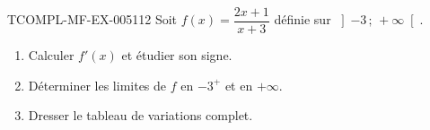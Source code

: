 \begin{exercice}{TCOMPL-MF-EX-005}{1}{12}
Soit $f(x)=\dfrac{2x+1}{x+3}$ définie sur $\left]-3\,;\,+\infty\right[$.
\begin{enumerate}
  \item Calculer $f'(x)$ et étudier son signe.
  \item Déterminer les limites de $f$ en $-3^+$ et en $+\infty$.
  \item Dresser le tableau de variations complet.
\end{enumerate}
\end{exercice}
